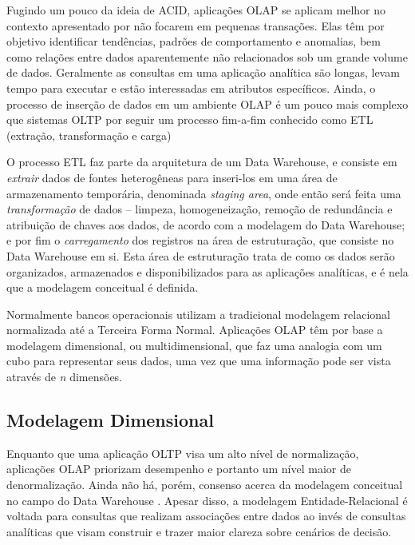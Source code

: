 \documentclass[conference]{IEEEtran}
\begin{document}
Fugindo um pouco da ideia de ACID, aplicações OLAP se aplicam melhor no contexto apresentado por não focarem em pequenas transações. Elas têm por objetivo identificar tendências, padrões de comportamento e anomalias, bem como relações entre dados aparentemente não relacionados \cite{codd1998providing} sob um grande volume de dados. Geralmente as consultas em uma aplicação analítica são longas, levam tempo para executar e estão interessadas em atributos específicos. Ainda, o processo de inserção de dados em um ambiente OLAP é um pouco mais complexo que sistemas OLTP por seguir um processo fim-a-fim conhecido como ETL (extração, transformação e carga) \cite{vertabelo2017olap}

O processo ETL faz parte da arquitetura de um Data Warehouse, e consiste em \textit{extrair} dados de fontes heterogêneas para inseri-los em uma área de armazenamento temporária, denominada \textit{staging area}, onde então será feita uma \textit{transformação} de dados -- limpeza, homogeneização, remoção de redundância e atribuição de chaves aos dados, de acordo com a modelagem do Data Warehouse; e por fim o \textit{carregamento} dos registros na área de estruturação, que consiste no Data Warehouse em si. Esta área de estruturação trata de como os dados serão organizados, armazenados e disponibilizados para as aplicações analíticas, e é nela que a modelagem conceitual é definida.

Normalmente bancos operacionais utilizam a tradicional modelagem relacional normalizada até a Terceira Forma Normal. Aplicações OLAP têm por base a modelagem dimensional, ou multidimensional, que faz uma analogia com um cubo para representar seus dados, uma vez que uma informação pode ser vista através de \textit{n} dimensões.



\subsection{Modelagem Dimensional}

Enquanto que uma aplicação OLTP visa um alto nível de normalização, aplicações OLAP priorizam desempenho e portanto um nível maior de denormalização. Ainda não há, porém, consenso acerca da modelagem conceitual no campo do Data Warehouse \cite{sen2005comparison}. Apesar disso, a modelagem Entidade-Relacional é voltada para consultas que realizam associações entre dados ao invés de consultas analíticas \cite{kimball2002dw} que visam construir e trazer maior clareza sobre cenários de decisão.
\end{document}
